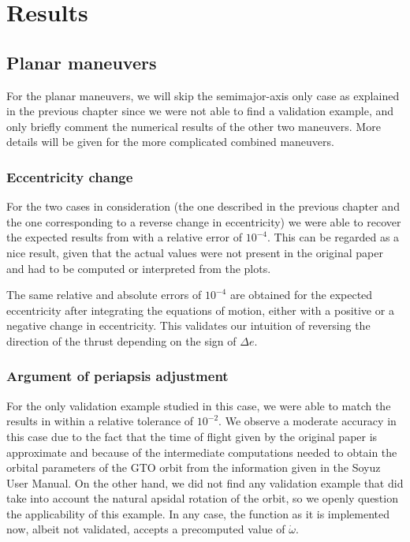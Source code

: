 \chapter{Results} \label{sec:results}

\section{Planar maneuvers} \label{sec:resplanar}

For the planar maneuvers, we will skip the semimajor-axis only case as explained in the previous chapter since we were not able to find a validation example, and only briefly comment the numerical results of the other two maneuvers. More details will be given for the more complicated combined maneuvers.

\subsection{Eccentricity change} \label{sec:resecc}

For the two cases in consideration (the one described in the previous chapter and the one corresponding to a reverse change in eccentricity) we were able to recover the expected results from \cite{pollard1997simplified} with a relative error of $10^{-4}$. This can be regarded as a nice result, given that the actual values were not present in the original paper and had to be computed or interpreted from the plots.

The same relative and absolute errors of $10^{-4}$ are obtained for the expected eccentricity after integrating the equations of motion, either with a positive or a negative change in eccentricity. This validates our intuition of reversing the direction of the thrust depending on the sign of $\Delta e$.

\subsection{Argument of periapsis adjustment}

For the only validation example studied in this case, we were able to match the results in \cite{ruggiero2011low} within a relative tolerance of $10^{-2}$. We observe a moderate accuracy in this case due to the fact that the time of flight given by the original paper is approximate and because of the intermediate computations needed to obtain the orbital parameters of the GTO orbit from the information given in the Soyuz User Manual. On the other hand, we did not find any validation example that did take into account the natural apsidal rotation of the orbit, so we openly question the applicability of this example. In any case, the function as it is implemented now, albeit not validated, accepts a precomputed value of $\dot{\omega}$.

